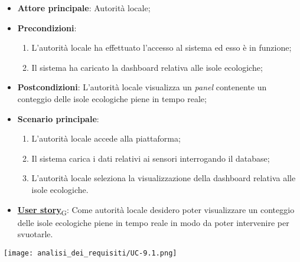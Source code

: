 \begin{itemize}
	\item \textbf{Attore principale}: Autorità locale;
	\item \textbf{Precondizioni}:
	      \begin{enumerate}
		      \item L'autorità locale ha effettuato l'accesso al sistema ed esso è in funzione;
		      \item Il sistema ha caricato la dashboard relativa alle isole ecologiche;
	      \end{enumerate}
	\item \textbf{Postcondizioni}: L'autorità locale visualizza un \textit{panel} contenente un conteggio delle isole ecologiche piene in tempo reale;
	\item \textbf{Scenario principale}:
	      \begin{enumerate}
		      \item L'autorità locale accede alla piattaforma;
		      \item Il sistema carica i dati relativi ai sensori interrogando il database;
		      \item L'autorità locale seleziona la visualizzazione della dashboard relativa alle isole ecologiche.
	      \end{enumerate}
	\item \href{https://7last.github.io/docs/rtb/documentazione-interna/glossario\#user-story}{\textbf{User story}\textsubscript{G}}:
	      Come autorità locale desidero poter visualizzare un conteggio delle isole ecologiche piene in tempo reale in modo da poter intervenire
	      per svuotarle.
\end{itemize}
\begin{center}
	\texttt{[image: analisi\_dei\_requisiti/UC-9.1.png]}
\end{center}

